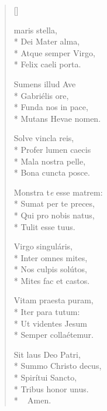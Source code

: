 \newHymn



\settowidth{\versewidth}{Ave maris stella..}

\pointtrans


\begin{multicols}{2}
\begin{verse}[\versewidth]

 maris stella, \\*
Dei Mater alma,   \\*      
Atque semper Virgo, \\*    
Felix caeli porta.      
\pointtrans

Sumens illud Ave        \\*
Gabriélis ore,          \\*
Funda nos in pace,      \\*
Mutans Hevae nomen.     

Solve vincla reis,     \\*
Profer lumen caecis     \\*
Mala nostra pelle,      \\*
Bona cuncta posce.      

Monstra t\textit{e} esse matrem: \\*
Sumat per te preces,    \\*
Qui pro nobis natus,    \\*
Tulit esse tuus.        
                 

Virgo singuláris,       \\*
Inter omnes mites,      \\*
Nos culpis solútos,     \\*
Mites fac et castos.    

Vitam praesta puram,    \\*
Iter para tutum:        \\*
Ut videntes Jesum       \\*
Semper collaétemur.     

Sit laus Deo Patri,     \\*
Summo Christo decus,    \\*
Spirítui Sancto,        \\*
Tribus honor unus.\\*
 ~ \quad Amen.

\end{verse}
\end{multicols}



